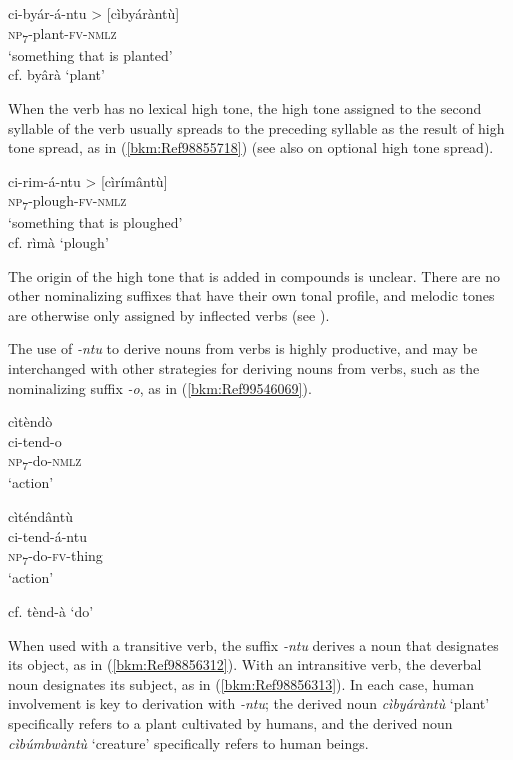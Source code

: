 \ea
\label{bkm:Ref492028234}
ci-byár-á-ntu > [cìbyáràntù]\\
\textsc{np}\textsubscript{7}-plant-\textsc{fv}-\textsc{nmlz}\\
\glt ‘something that is planted’\\
cf. byârà ‘plant’
\z

When the verb has no lexical high tone, the high tone assigned to the second syllable of the verb usually spreads to the preceding syllable as the result of high tone spread, as in (\ref{bkm:Ref98855718}) (see also  on optional high tone spread).

\ea
\label{bkm:Ref98855718}
ci-rim-á-ntu > [cìrímântù]\\
\textsc{np}\textsubscript{7}-plough-\textsc{fv}-\textsc{nmlz}\\
\glt ‘something that is ploughed’\\
 cf. rìmà ‘plough’
\z

The origin of the high tone that is added in compounds is unclear. There are no other nominalizing suffixes that have their own tonal profile, and melodic tones are otherwise only assigned by inflected verbs (see ).

The use of \textit{-ntu} to derive nouns from verbs is highly productive, and may be interchanged with other strategies for deriving nouns from verbs, such as the nominalizing suffix \textit{-o}, as in (\ref{bkm:Ref99546069}).

\ea
\label{bkm:Ref99546069}
\ea
\glll cìtèndò\\
ci-tend-o\\
\textsc{np}\textsubscript{7}-do-\textsc{nmlz}\\
\glt ‘action’

\ex
\glll cìténdântù\\
ci-tend-á-ntu\\
\textsc{np}\textsubscript{7}-do-\textsc{fv}-thing\\
\glt ‘action’

\ex
 cf. tènd-à ‘do’
\z\z

When used with a transitive verb, the suffix \textit{-ntu} derives a noun that designates its object, as in (\ref{bkm:Ref98856312}). With an intransitive verb, the deverbal noun designates its subject, as in (\ref{bkm:Ref98856313}). In each case, human involvement is key to derivation with \textit{-ntu}; the derived noun \textit{cìbyáràntù} ‘plant’ specifically refers to a plant cultivated by humans, and the derived noun \textit{cìbúmbwàntù} ‘creature’ specifically refers to human beings.


